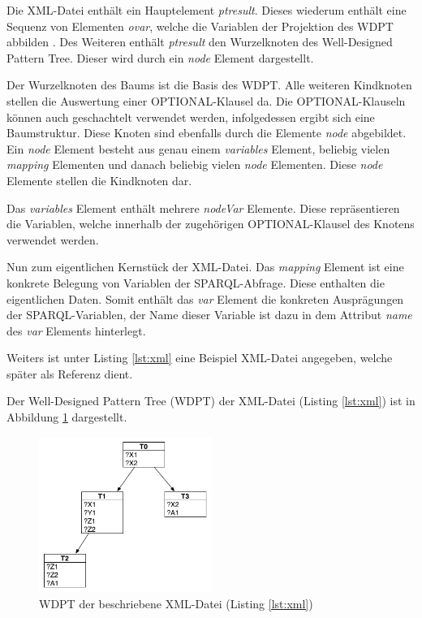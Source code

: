 \documentclass[draft,final]{vutinfth} %
\begin{document}
Die XML-Datei enthält ein Hauptelement \textit{ptresult}. Dieses wiederum enthält eine Sequenz von Elementen \textit{ovar}, welche die Variablen der Projektion des WDPT abbilden \cite{OptMat}. Des Weiteren enthält \textit{ptresult} den Wurzelknoten des Well-Designed Pattern Tree. Dieser wird durch ein \textit{node} Element dargestellt.

Der Wurzelknoten des Baums ist die Basis des WDPT. Alle weiteren Kindknoten stellen die Auswertung einer OPTIONAL-Klausel da. Die OPTIONAL-Klauseln können auch geschachtelt verwendet werden, infolgedessen ergibt sich eine Baumstruktur. Diese Knoten sind ebenfalls durch die Elemente \textit{node} abgebildet. Ein \textit{node} Element besteht aus genau einem \textit{variables} Element, beliebig vielen \textit{mapping} Elementen und danach beliebig vielen \textit{node} Elementen. Diese \textit{node} Elemente stellen die Kindknoten dar.

Das \textit{variables} Element enthält mehrere \textit{nodeVar} Elemente. Diese repräsentieren die Variablen, welche innerhalb der zugehörigen OPTIONAL-Klausel des Knotens verwendet werden.

Nun zum eigentlichen Kernstück der XML-Datei. Das \textit{mapping} Element ist eine konkrete Belegung von Variablen der SPARQL-Abfrage. Diese enthalten die eigentlichen Daten. Somit enthält das \textit{var} Element die konkreten Ausprägungen der SPARQL-Variablen, der Name dieser Variable ist dazu in dem Attribut \textit{name} des \textit{var} Elements hinterlegt.\\

\pagebreak


Weiters ist unter Listing \ref{lst:xml} eine Beispiel XML-Datei angegeben, welche später als Referenz dient.


Der Well-Designed Pattern Tree (WDPT) der XML-Datei (Listing \ref{lst:xml}) ist in Abbildung \ref{wdptBsp} dargestellt.
\begin{figure}[ht]
	\centering
	\includegraphics[width=0.5\textwidth]{WDPT}
	\caption{WDPT der beschriebene XML-Datei (Listing \ref{lst:xml})}
	\label{wdptBsp}
\end{figure}
\end{document}
